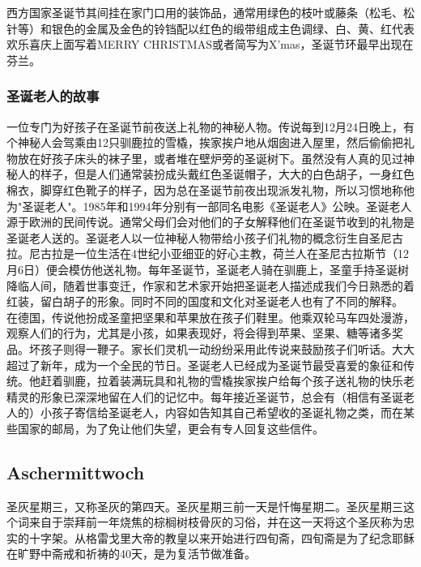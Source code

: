 西方国家圣诞节其间挂在家门口用的装饰品，通常用绿色的枝叶或藤条（松毛、松针等）和银色的金属及金色的铃铛配以红色的缎带组成主色调绿、白、黄、红代表欢乐喜庆上面写着MERRY CHRISTMAS或者简写为X'mas，圣诞节环最早出现在芬兰。

\subsubsection{圣诞老人的故事}
一位专门为好孩子在圣诞节前夜送上礼物的神秘人物。传说每到12月24日晚上，有个神秘人会驾乘由12只驯鹿拉的雪橇，挨家挨户地从烟囱进入屋里，然后偷偷把礼物放在好孩子床头的袜子里，或者堆在壁炉旁的圣诞树下。虽然没有人真的见过神秘人的样子，但是人们通常装扮成头戴红色圣诞帽子，大大的白色胡子，一身红色棉衣，脚穿红色靴子的样子，因为总在圣诞节前夜出现派发礼物，所以习惯地称他为"圣诞老人"。1985年和1994年分别有一部同名电影《圣诞老人》公映。圣诞老人源于欧洲的民间传说。通常父母们会对他们的子女解释他们在圣诞节收到的礼物是圣诞老人送的。圣诞老人以一位神秘人物带给小孩子们礼物的概念衍生自圣尼古拉。尼古拉是一位生活在4世纪小亚细亚的好心主教，荷兰人在圣尼古拉斯节（12月6日）便会模仿他送礼物。每年圣诞节，圣诞老人骑在驯鹿上，圣童手持圣诞树降临人间，随着世事变迁，作家和艺术家开始把圣诞老人描述成我们今日熟悉的着红装，留白胡子的形象。同时不同的国度和文化对圣诞老人也有了不同的解释。
在德国，传说他扮成圣童把坚果和苹果放在孩子们鞋里。他乘双轮马车四处漫游，观察人们的行为，尤其是小孩，如果表现好，将会得到苹果、坚果、糖等诸多奖品。坏孩子则得一鞭子。家长们灵机一动纷纷采用此传说来鼓励孩子们听话。大大超过了新年，成为一个全民的节日。圣诞老人已经成为圣诞节最受喜爱的象征和传统。他赶着驯鹿，拉着装满玩具和礼物的雪橇挨家挨户给每个孩子送礼物的快乐老精灵的形象已深深地留在人们的记忆中。每年接近圣诞节，总会有（相信有圣诞老人的）小孩子寄信给圣诞老人，内容如告知其自己希望收的圣诞礼物之类，而在某些国家的邮局，为了免让他们失望，更会有专人回复这些信件。
\subsection{Aschermittwoch}

圣灰星期三，又称圣灰的第四天。圣灰星期三前一天是忏悔星期二。圣灰星期三这个词来自于崇拜前一年烧焦的棕榈树枝骨灰的习俗，并在这一天将这个圣灰称为忠实的十字架。从格雷戈里大帝的教皇以来开始进行四旬斋，四旬斋是为了纪念耶稣在旷野中斋戒和祈祷的40天，是为复活节做准备。